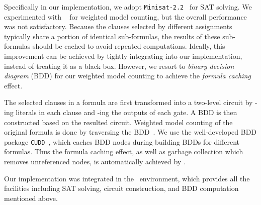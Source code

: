 Specifically in our implementation,
we adopt \texttt{Minisat-2.2}~\cite{Een2003Solver} for SAT solving.
We experimented with \cachet~\cite{Sang2004,Sang2005ModelCounting} for weighted model counting,
but the overall performance was not satisfactory.
Because the clauses selected by different assignments typically share a portion of identical sub-formulas,
the results of these sub-formulas should be cached to avoid repeated computations.
Ideally, this improvement can be achieved by tightly integrating \cachet into our implementation,
instead of treating it as a black box.
However, we resort to \textit{binary decision diagram} (BDD) for our weighted model counting to achieve the \textit{formula caching} effect.

The selected clauses in a formula are first transformed into a two-level circuit by \disjoin-ing literals in each clause and \conjoin-ing the outputs of each \disjoin gate.
A BDD is then constructed based on the resulted circuit.
Weighted model counting of the original formula is done by traversing the BDD~\cite{LeeTC18ProbDesign}.
We use the well-developed BDD package \texttt{CUDD}~\cite{CUDD},
which caches BDD nodes during building BDDs for different formulas.
Thus the formula caching effect,
as well as garbage collection which removes unreferenced nodes,
is automatically achieved by \cudd.

Our implementation was integrated in the \abc~\cite{ABC}environment,
which provides all the facilities including SAT solving, circuit construction, and BDD computation mentioned above.